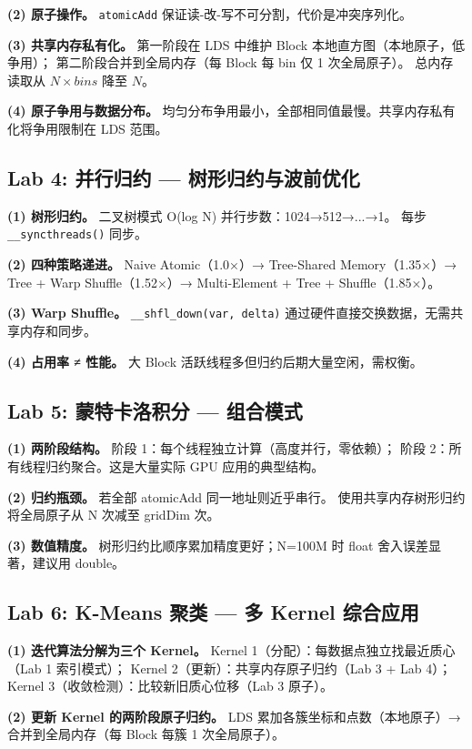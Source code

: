 \documentclass[UTF8,a4paper,10pt]{ctexart}
\begin{document}
\textbf{(2) 原子操作。} \texttt{atomicAdd} 保证读-改-写不可分割，代价是冲突序列化。

\textbf{(3) 共享内存私有化。} 第一阶段在 LDS 中维护 Block 本地直方图（本地原子，低争用）；
第二阶段合并到全局内存（每 Block 每 bin 仅 1 次全局原子）。
总内存读取从 $N \times bins$ 降至 $N$。

\textbf{(4) 原子争用与数据分布。}
均匀分布争用最小，全部相同值最慢。共享内存私有化将争用限制在 LDS 范围。

\subsection{Lab 4: 并行归约 — 树形归约与波前优化}

\textbf{(1) 树形归约。} 二叉树模式 O(log N) 并行步数：1024→512→...→1。
每步 \texttt{\_\_syncthreads()} 同步。

\textbf{(2) 四种策略递进。}
Naive Atomic（1.0×）→ Tree-Shared Memory（1.35×）→
Tree + Warp Shuffle（1.52×）→ Multi-Element + Tree + Shuffle（1.85×）。

\textbf{(3) Warp Shuffle。}
\texttt{\_\_shfl\_down(var, delta)} 通过硬件直接交换数据，无需共享内存和同步。

\textbf{(4) 占用率 ≠ 性能。} 大 Block 活跃线程多但归约后期大量空闲，需权衡。

\subsection{Lab 5: 蒙特卡洛积分 — 组合模式}

\textbf{(1) 两阶段结构。} 阶段 1：每个线程独立计算（高度并行，零依赖）；
阶段 2：所有线程归约聚合。这是大量实际 GPU 应用的典型结构。

\textbf{(2) 归约瓶颈。} 若全部 atomicAdd 同一地址则近乎串行。
使用共享内存树形归约将全局原子从 N 次减至 gridDim 次。

\textbf{(3) 数值精度。}
树形归约比顺序累加精度更好；N=100M 时 float 舍入误差显著，建议用 double。

\subsection{Lab 6: K-Means 聚类 — 多 Kernel 综合应用}

\textbf{(1) 迭代算法分解为三个 Kernel。}
Kernel 1（分配）：每数据点独立找最近质心（Lab 1 索引模式）；
Kernel 2（更新）：共享内存原子归约（Lab 3 + Lab 4）；
Kernel 3（收敛检测）：比较新旧质心位移（Lab 3 原子）。

\textbf{(2) 更新 Kernel 的两阶段原子归约。}
LDS 累加各簇坐标和点数（本地原子）→ 合并到全局内存（每 Block 每簇 1 次全局原子）。
\end{document}

